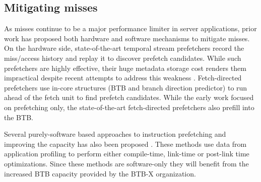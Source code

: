 
\subsection{Mitigating  misses}
As  misses continue to be a major performance limiter in server applications\cite{profileWarehouse, jukebox, wosc}, prior work has proposed both hardware and software mechanisms to mitigate  misses. On the hardware side, state-of-the-art temporal stream prefetchers \cite{tifs, pif} record the  miss/access history and replay it to discover prefetch candidates. While such prefetchers are highly effective, their huge metadata storage cost renders them impractical despite recent attempts to address this weakness \cite{shift, confluence}. Fetch-directed prefetchers use in-core structures (BTB and branch direction predictor) to run ahead of the fetch unit to find prefetch candidates. While the early work \cite{fdip} focused on  prefetching only, the state-of-the-art fetch-directed prefetchers \cite{boomerang, shotgun} also prefill into the BTB.


Several purely-software based approaches to instruction prefetching and improving the  capacity has also been proposed \cite{chen2016autofdo, li2010lightweight, ottoni2017optimizing, luk2004ispike, panchenko2019bolt, luk1998cooperative, annavaram2003call, ayers2019asmdb, khan2020spy}. These methods use data from application profiling to perform either compile-time, link-time or post-link time optimizations. Since these methods are software-only they will benefit from the increased BTB capacity provided by the BTB-X organization. %
